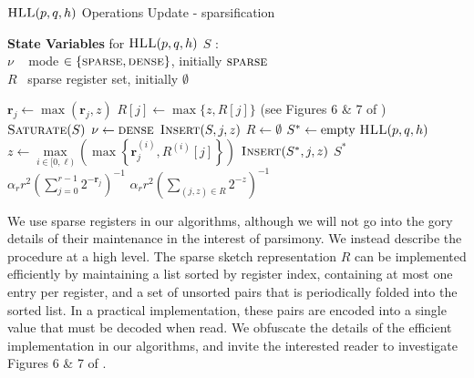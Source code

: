 \documentclass[10]{report}
\newcommand{\algoname}[1]{\textnormal{\textsc{#1}}}
\begin{document}
\begin{algorithm}[htbp] 
\caption{$\algoname{HLL}(p,q,h)$ Operations  Update - sparsification}\label{alg:hll:sparse}
\begin{flushleft}
        \textbf{State Variables} for $\algoname{HLL}(p, q, h)$ $S$ :		\\
    		\hspace{2.65em}	$\nu$  \,\,\, mode $\in \{\algoname{sparse}, \algoname{dense}\}$, initially $\algoname{sparse}$ \\
    		\hspace{2.65em}	$R$  \, sparse register set, initially $\emptyset$
\end{flushleft}
\begin{algorithmic}[1]
		\If {$\nu = \algoname{dense}$}
			\State $\mathbf{r}_j \gets \max ( \mathbf{r}_j, z)$
		\ElsIf {$\nu = \algoname{sparse}$}
			\State $R[j] \gets \max \{z, R[j]\}$ (see Figures 6 \& 7 of \cite{heule2013hyperloglog})
				\State $\algoname{Saturate}(S)$
			\EndIf
		\EndIf
	\EndFunction
%
		\State $\nu \gets \algoname{dense}$
			\State $\algoname{Insert}(S, j, z)$
		\EndFor
		\State $R \gets \emptyset$
	\EndFunction
%
		\State $S^* \gets \text{empty $\algoname{HLL}(p, q, h)$}$
		\For{$j \in [0,r)$} 
			\State $z \gets  \max\limits_{ i \in [0, \ell)} \left ( \max \left \{ \mathbf{r}^{(i)}_j, R^{(i)}[j] \right \} \right )$
				\State $\algoname{Insert}(S^*, j, z)$
			\EndIf
		\EndFor
		\State \Return $S^*$
	\EndFunction
%
		\If{$\nu = \algoname{dense}$}
			\State \Return $\alpha_r r^2 \left ( \sum\limits_{j=0}^{r-1} 2^{-\mathbf{r}_j} \right) ^{-1}$
		\Else
			\State \Return $\alpha_r r^2 \left ( \sum\limits_{(j, z) \in R} 2^{-z} \right) ^{-1}$
		\EndIf
	\EndFunction
\end{algorithmic}
\end{algorithm}


We use sparse registers in our algorithms, although we will not go into the gory details of their maintenance in the interest of parsimony.
We instead describe the procedure at a high level.
The sparse sketch representation $R$ can be implemented efficiently by maintaining a list sorted by register index, containing at most one entry per register, and a set of unsorted pairs that is periodically folded into the sorted list.
In a practical implementation, these pairs are encoded into a single value that must be decoded when read.
We obfuscate the details of the efficient implementation in our algorithms, and invite the interested reader to investigate Figures 6 \& 7 of \cite{heule2013hyperloglog}.
\end{document}
